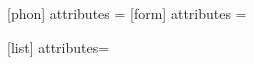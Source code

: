 \usepackage{./styles/abbrev}



\usepackage{langsci-gb4e} 








\usepackage{./styles/additional-langsci-index-shortcuts}

\usepackage{langsci-avm}

[phon]
  {
    attributes  = \itshape%
}
[form]
  {
    attributes  = \itshape%
}

[list]{ attributes=\itshape } %







\usepackage{./styles/avm+}


\renewcommand{\tpv}[1]{{\avmjvalfont\itshape #1}}

\renewcommand{\phonshape}[0]{\normalfont\itshape}

